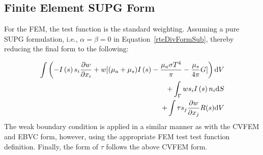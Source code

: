 \subsection{Finite Element SUPG Form}
For the FEM, the test function is the standard weighting. Assuming a pure SUPG formulation, i.e.,
$\alpha = \beta = 0$ in Equation~\ref{rteDivFormSub}, thereby reducing the final form to the following:

\begin{eqnarray}
   \int \left( -I\left(s\right) s_i \frac{\partial w}{\partial x_i} + w[(\mu_a + \mu_s) I\left(s\right) 
- {{\mu_a \sigma T^4} \over {\pi}} -\frac{\mu_s}{4\pi}G ] \right) {\rm d}V  \nonumber \\
+ \int_\Gamma w s_i I\left(s\right) n_i {\rm d}S \nonumber \\
 +\int \tau s_j \frac{\partial w }{\partial x_j} R(s) {\rm d}V \nonumber \\
\label{rteFemSUPG}
\end{eqnarray}
The weak boundary condition is applied in a similar manner as with the CVFEM and EBVC form, however,
using the appropriate FEM test test function definition. Finally, the form of $\tau$ follows the above
CVFEM form.
